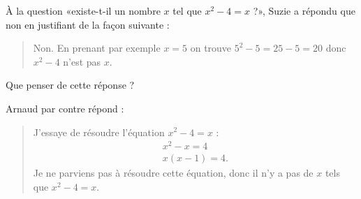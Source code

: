 
\begin{exercice}\label{exosmath-0562}

    À la question «existe-t-il un nombre \( x\) tel que \( x^2-4=x\) ?», Suzie a répondu que non en justifiant de la façon suivante : 
    \begin{quote}
        Non. En prenant par exemple \( x=5\) on trouve \( 5^2-5=25-5=20\) donc \( x^2-4\) n'est pas \( x\).
    \end{quote}
    Que penser de cette réponse ?

    Arnaud par contre répond :
    \begin{quote}
        J'essaye de résoudre l'équation \( x^2-4=x\) :
        \begin{subequations}
            \begin{align*}
                x^2-x=4\\
                x(x-1)=4.
            \end{align*}
        \end{subequations}
        Je ne parviens pas à résoudre cette équation, donc il n'y a pas de \( x\) tels que \( x^2-4=x\).
    \end{quote}

\end{exercice}
